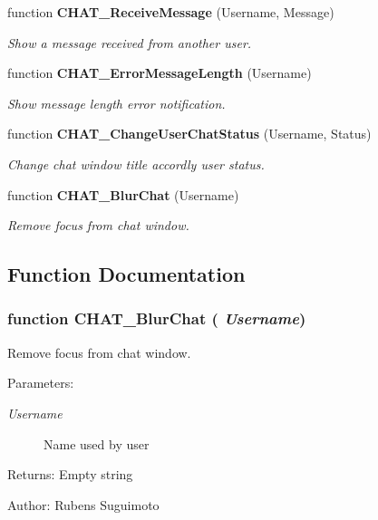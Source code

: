\begin{CompactItemize}
function {\bf CHAT\_\-ReceiveMessage} (Username, Message)
\begin{CompactList}\small\item\em Show a message received from another user. \item\end{CompactList}\item 
function {\bf CHAT\_\-ErrorMessageLength} (Username)
\begin{CompactList}\small\item\em Show message length error notification. \item\end{CompactList}\item 
function {\bf CHAT\_\-ChangeUserChatStatus} (Username, Status)
\begin{CompactList}\small\item\em Change chat window title accordly user status. \item\end{CompactList}\item 
function {\bf CHAT\_\-BlurChat} (Username)
\begin{CompactList}\small\item\em Remove focus from chat window. \item\end{CompactList}\end{CompactItemize}


\subsection{Function Documentation}
\subsubsection[CHAT\_\-BlurChat]{\setlength{\rightskip}{0pt plus 5cm}function CHAT\_\-BlurChat ( {\em Username})}\label{chat_2chat_8js_ff66224f1bef79c354a9da91143aed36}


Remove focus from chat window. 

\begin{Desc}
\item[Parameters:]
\begin{description}
\item[{\em Username}]Name used by user \end{description}
\end{Desc}
\begin{Desc}
\item[Returns:]Empty string \end{Desc}
\begin{Desc}
\item[Author:]Rubens Suguimoto \end{Desc}


